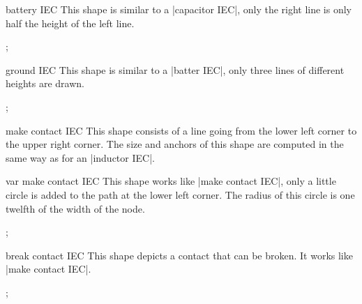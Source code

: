 \begin{shape}{battery IEC}
  This shape is similar to a |capacitor IEC|, only the right line is
  only half the height of the left line.
\begin{codeexample}[]
\tikz \node[shape=battery IEC,shape example,minimum size=2cm,
            inner sep=0pt] {};    
\end{codeexample}
\end{shape}

\begin{shape}{ground IEC}
  This shape is similar to a |batter IEC|, only three lines of
  different heights are drawn.
\begin{codeexample}[]
\tikz \node[shape=ground IEC,shape example,minimum size=2cm,
            inner sep=0pt] {};    
\end{codeexample}
\end{shape}

\begin{shape}{make contact IEC}
  This shape consists of a line going from the lower left corner to
  the upper right corner. The size and anchors of this shape are
  computed in the same way as for an |inductor IEC|.
\begin{codeexample}[]
\end{codeexample}
\end{shape}

\begin{shape}{var make contact IEC}
  This shape works like |make contact IEC|, only a little circle is
  added to the path at the lower left corner. The radius of this
  circle is one twelfth of the width of the node.
\begin{codeexample}[]
\tikz \node[shape=var make contact IEC,shape example,
            minimum height=1cm,minimum width=3cm,inner sep=0pt] {};    
\end{codeexample}
\end{shape}

\begin{shape}{break contact IEC}
  This shape depicts a contact that can be broken. It works like
  |make contact IEC|.
\begin{codeexample}[]
\tikz \node[shape=break contact IEC,shape example,
            minimum height=1cm,minimum width=3cm,inner sep=0pt] {};    
\end{codeexample}
\end{shape}

\endinput




